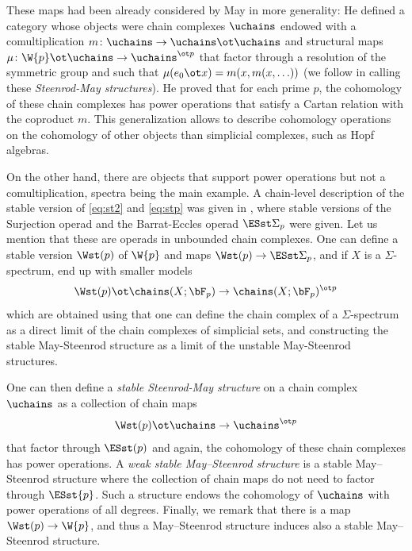 These maps had been already considered by May \cite{may1970general} in more generality: He defined a category whose objects were chain complexes $\uchains$ endowed with a comultiplication $m\colon \uchains\to \uchains\ot \uchains$ and structural maps $\mu\colon \W{p}\ot \uchains\to \uchains^{\ot p}$ that factor through a resolution of the symmetric group and such that $\mu(e_0\ot x) = m(x, m(x,\ldots))$ (we follow \cite{medina2021may_st} in calling these \emph{Steenrod-May structures}). He proved that for each prime $p$, the cohomology of these chain complexes has power operations that satisfy a Cartan relation with the coproduct $m$. This generalization allows to describe cohomology operations on the cohomology of other objects than simplicial complexes, such as Hopf algebras.

On the other hand, there are objects that support power operations but not a comultiplication, spectra being the main example. A chain-level description of the stable version of \eqref{eq:st2} and \eqref{eq:stp} was given in \cite{Gill2020}, where stable versions of the Surjection operad and the Barrat-Eccles operad $\ESst\Sigma_p$ were given. Let us mention that these are operads in unbounded chain complexes. One can define a stable version $\Wst(p)$ of $\W{p}$ and maps $\Wst(p)\to \ESst\Sigma_p$, and if $X$ is a $\Sigma$-spectrum, end up with smaller models
\[
 \Wst(p)\ot \chains(X;\bF_p)\to \chains(X;\bF_p)^{\ot p}
\]
which are obtained using that one can define the chain complex of a $\Sigma$-spectrum as a direct limit of the chain complexes of simplicial sets, and constructing the stable May-Steenrod structure as a limit of the unstable May-Steenrod structures.

One can then define a \emph{stable Steenrod-May structure} on a chain complex $\uchains$ as a collection of chain maps
\begin{equation}\label{eq:tatediag}
\Wst(p)\ot \uchains\to \uchains^{\ot p}
\end{equation}
that factor through $\ESst(p)$ and again, the cohomology of these chain complexes has power operations. A \emph{weak stable May--Steenrod structure} is a stable May--Steenrod structure where the collection of chain maps do not need to factor through $\ESst{p}$. Such a structure endows the cohomology of $\uchains$ with power operations of all degrees. Finally, we remark that there is a map $\Wst(p)\to \W{p}$, and thus a May--Steenrod structure induces also a stable May--Steenrod structure.

